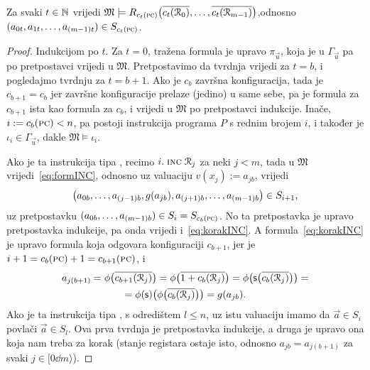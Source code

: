 \begin{lema}[{name=[izračunavanje čuva istinitost formula pojedinih konfiguracija]}]\label{lm:formcomputesteps}
Za svaki $t\in{\mathbb N}$ vrijedi $\mathfrak M\models R_{c_t(\textsc{pc})}\bigl(\overline{c_t(\mathcal R_{0})},\dotsc,\overline{c_t(\mathcal R_{m-1})}\bigr)$,\newline odnosno $(a_{0t},a_{1t},\dotsc,a_{(m-1)t})\in S_{c_t(\textsc{pc})}$.
\end{lema}
\begin{proof}
Indukcijom po $t$. Za $t=0$, tražena formula je upravo $\pi_{\vec u}$, koja je u $\Gamma_{\vec u}$ pa po pretpostavci vrijedi u $\mathfrak M$. Pretpostavimo da tvrdnja vrijedi za $t=b$, i pogledajmo tvrdnju za $t=b+1$. Ako je $c_b$ završna konfiguracija, tada je $c_{b+1}=c_b$ jer završne konfiguracije prelaze (jedino) u same sebe, pa je formula za $c_{b+1}$ ista kao formula za $c_b$, i vrijedi u $\mathfrak M$ po pretpostavci indukcije. Inače, $i:=c_b(\textsc{pc})<n$, pa postoji instrukcija programa $P$ s rednim brojem $i$, i također je $\iota_i\in\Gamma_{\vec u}$, dakle $\mathfrak M\models\iota_i$.

Ako je ta instrukcija tipa \inc, recimo $i.\;\textsc{inc}\;\mathcal R_{j}$ za neki $j<m$, tada u $\mathfrak M$ vrijedi~\eqref{eq:formINC}, odnosno uz valuaciju $v(x_j):=a_{jb}$, vrijedi
\begin{equation}
\label{eq:korakINC}
    \bigl(a_{0b},\dotsc,a_{(j-1)b},g(a_{jb}),a_{(j+1)b},\dotsc,a_{(m-1)b}\bigr)\in S_{i+1}\text,
\end{equation} uz pretpostavku $(a_{0b},\dotsc,a_{(m-1)b})\in S_i=S_{c_b(\textsc{pc})}$. No ta pretpostavka je upravo pretpostavka indukcije, pa onda vrijedi i~\eqref{eq:korakINC}. A formula~\eqref{eq:korakINC} je upravo formula koja odgovara konfiguraciji $c_{b+1}$, jer je $i+1=c_b(\textsc{pc})+1=c_{b+1}(\textsc{pc})$, i
\begin{multline}
a_{j(b+1)}=\phi\bigl(\overline{c_{b+1}(\mathcal R_{j})}\bigr)=\phi\bigl(\overline{1+c_b(\mathcal R_{j})}\bigr)=\phi\bigl(\mathsf s\bigl(\overline{c_b(\mathcal R_{j})}\bigr)\bigr)=\\
=\phi(\mathsf s)\bigl(\phi\bigl(\overline{c_b(\mathcal R_{j})}\bigr)\bigr)=g(a_{jb})\text.
\end{multline}
Ako je ta instrukcija tipa \goto, s odredištem $l\le n$, uz istu valuaciju imamo da $\vec a\in S_i$ povlači $\vec a\in S_l$. Ova prva tvrdnja je pretpostavka indukcije, a druga je upravo ona koja nam treba za korak (stanje registara ostaje isto, odnosno $a_{jb}=a_{j(b+1)}$ za svaki $j\in[0\dd m\rangle$).


\end{proof}
